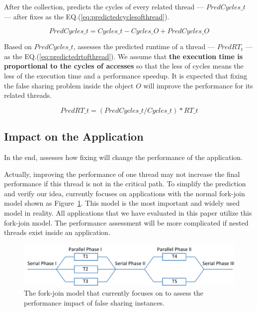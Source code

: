 After the collection, \cheetah{} predicts the cycles of every related thread --- $PredCycles\_{t}$ --- after fixes as the EQ.(\ref{eq:predictedcyclesofthread}). 

\begin{equation}
\label{eq:predictedcyclesofthread}
 PredCycles\_{t} = Cycles\_{t} - Cycles\_{O} + PredCycles\_{O} 
\end{equation} 
 
Based on $PredCycles\_{t}$, \cheetah{} assesses the predicted runtime of a thread --- $PredRT_{t}$ --- as the EQ.(\ref{eq:predictedrtofthread}). We assume that {\bf the execution time is proportional to the cycles of accesses} so that the less of cycles means the less of the execution time and a performance speedup. It is expected that fixing the false sharing problem inside the object $O$ will improve the performance for its related threads. 

\begin{equation}
\label{eq:predictedrtofthread}
 PredRT\_{t} = (PredCycles\_{t} / Cycles\_{t}) * RT\_{t} 
\end{equation} 

\subsection{Impact on the Application}
\label{sec:impactapp}

In the end, \cheetah{} assesses how fixing will change the performance of the application. 

Actually, improving the performance of one thread may not increase the final performance if this thread is not in the critical path.  To simplify the prediction and verify our idea, \cheetah{} currently focuses on applications with the normal fork-join model shown as Figure~\ref{fig:forkjoinmodel}. This model is the most important and widely used model in reality. All applications that we have evaluated in this paper utilize this fork-join model. The performance assessment will be more complicated if nested threads exist inside an application. 


\begin{figure}[ht!]
\begin{center}
\includegraphics[width=6in]{figure/forkjoin}
\end{center}
\caption{The fork-join model that \Cheetah{} currently focuses on to assess the performance impact of false sharing instances. }
\label{fig:forkjoinmodel}
\end{figure}


